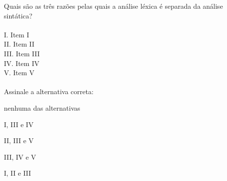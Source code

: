 \question[10]

Quais são as três razões pelas quais a análise léxica é separada da análise sintática?\\
\\
I. Item I\\
II. Item II\\
III. Item III\\
IV. Item IV\\
V. Item V\\
\\
Assinale a alternativa correta:
\begin{choices}
\item nenhuma das alternativas
\item I, III e IV
\item II, III e V %
\item III, IV e V
\item I, II e III
\end{choices}
\answerline
